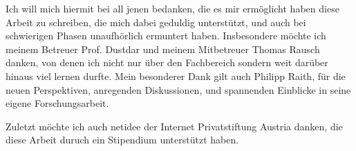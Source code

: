 \documentclass[draft,final]{vutinfth} %
\begin{document}
\frontmatter %

\addstatementpage

\begin{danksagung*}
Ich will mich hiermit bei all jenen bedanken, die es mir ermöglicht haben diese Arbeit zu schreiben, die mich dabei geduldig unterstützt, und auch bei schwierigen Phasen unaufhörlich ermuntert haben.
Insbesondere möchte ich meinem Betreuer Prof. Dustdar und meinem Mitbetreuer Thomas Rausch danken, von denen ich nicht nur über den Fachbereich sondern weit darüber hinaus viel lernen durfte.
Mein besonderer Dank gilt auch Philipp Raith, für die neuen Perspektiven, anregenden Diskussionen, und spannenden Einblicke in seine eigene Forschungsarbeit.

Zuletzt möchte ich auch netidee der Internet Privatstiftung Austria danken, die diese Arbeit duruch ein Stipendium unterstützt haben.
\end{danksagung*}

\end{document}
